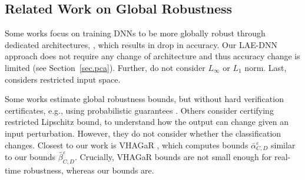 \subsection{Related Work on Global Robustness}

%


Some works focus on training DNNs to be more globally robust through dedicated architectures, \citep{Leino,Zhang22a,Sun22,Singla22}, 
which results in drop in accuracy. 
Our LAE-DNN approach does not require any change of architecture and thus accuracy change is limited (see Section~\ref{sec.pca}).
Further, \citet{Leino,Chen21,Singla22} do not consider $L_\infty$ or $L_1$ norm. Last, \citep{REGLO} considers restricted input space.  


Some works \citep{Bastani16,Ruan19,Gopinath18} estimate global robustness bounds, but without hard verification certificates, e.g., using probabilistic guarantees \citep{Levy23,Mangal19}.
Others \citep{Marabou,lipshitz,ITNE,GROCET} consider certifying restricted Lipschitz bound, to understand how the output can change given an input perturbation. However, they do not consider whether the classification changes. 
%
Closest to our work is VHAGaR \citep{vhagar}, which computes 
bounds $\bar{\alpha}^\varepsilon_{C,D}$ similar to our bounds 
$\bar{\beta}^\varepsilon_{C,D}$.
Crucially, VHAGaR bounds are not small enough for real-time robustness, whereas our bounds are. 


